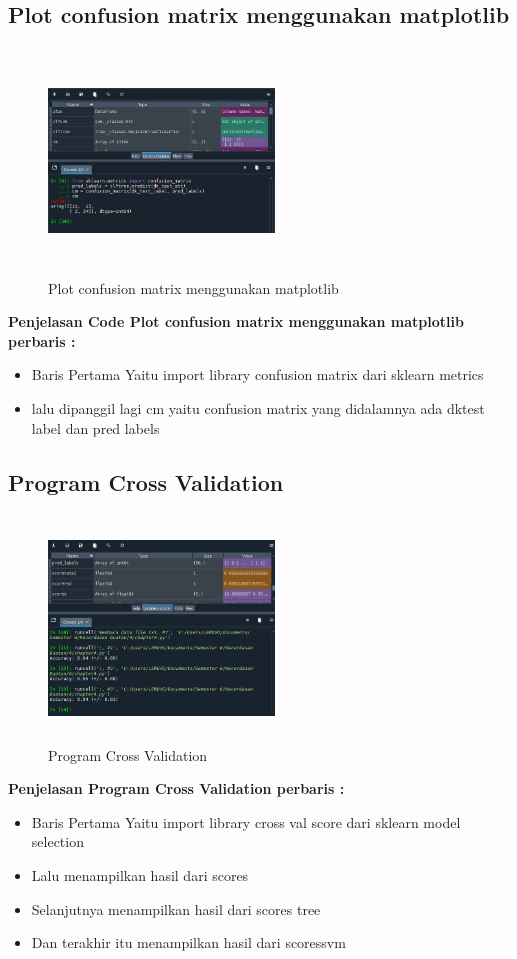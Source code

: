 \subsection{Plot confusion matrix menggunakan matplotlib}
\begin{figure}[!htbp]
	\centering
	\includegraphics[width=6cm,height=6cm]{figures/Cp4-6.png}
	\caption{Plot confusion matrix menggunakan matplotlib}
	\label{penanda}
\end{figure}
\textbf{Penjelasan Code Plot confusion matrix menggunakan matplotlib perbaris :}
\begin{itemize}
	\item Baris Pertama Yaitu import library confusion matrix dari sklearn metrics
	\item lalu dipanggil lagi cm yaitu confusion matrix yang didalamnya ada dktest label dan pred labels
\end{itemize}

\subsection{Program Cross Validation}
\begin{figure}[!htbp]
	\centering
	\includegraphics[width=6cm,height=6cm]{figures/Cp4-7.png}
	\caption{Program Cross Validation}
	\label{penanda}
\end{figure}
\textbf{Penjelasan Program Cross Validation perbaris :}
\begin{itemize}
	\item Baris Pertama Yaitu import library cross val score dari sklearn model selection
	\item Lalu menampilkan hasil dari scores
	\item Selanjutnya menampilkan hasil dari scores tree
	\item Dan terakhir itu menampilkan hasil dari scoressvm
\end{itemize}

